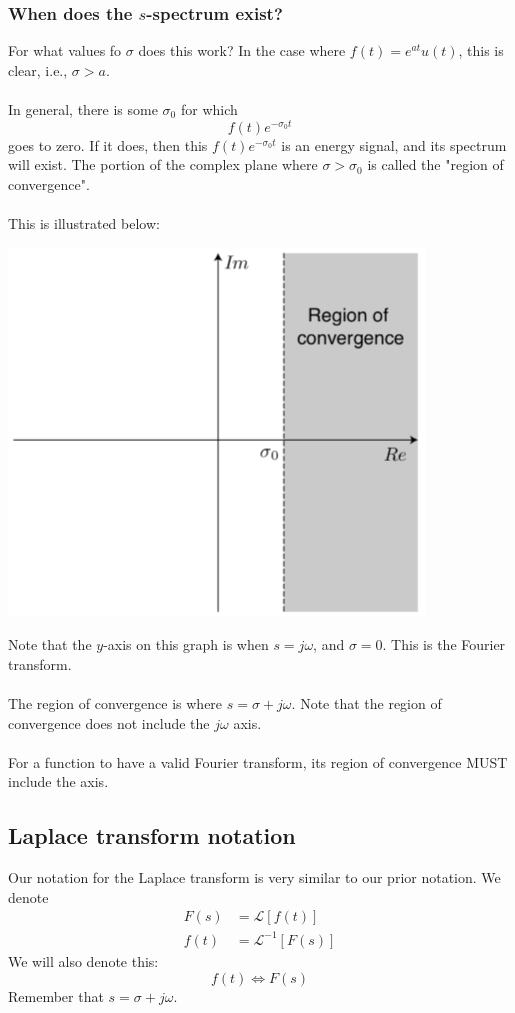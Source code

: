 \documentclass[10pt]{article}
\newcommand{\llra}{\Longleftrightarrow}
\begin{document}
\subsubsection*{When does the $s$-spectrum exist?}
For what values fo $\sigma$ does this work?  In the case where $f(t) = e^{at} u(t)$, this is clear, i.e., $\sigma > a$.\\\\
In general, there is some $\sigma_0$ for which
\[f(t) e^{-\sigma_0 t}\]
goes to zero.  If it does, then this $f(t) e^{-\sigma_0 t}$ is an energy signal, and its spectrum will exist.  The portion of the complex plane where $\sigma > \sigma_0$ is called the "region of convergence".\\\\
This is illustrated below:
\begin{center}
    \includegraphics*[scale=0.8]{W8_21.png}
\end{center}
Note that the $y$-axis on this graph is when $s = j\omega$, and $\sigma = 0$.  This is the Fourier transform.\\\\
The region of convergence is where $s = \sigma + j\omega$.  Note that the region of convergence does not include the $j\omega$ axis.\\\\
For a function to have a valid Fourier transform, its region of convergence MUST include the axis.

\subsection*{Laplace transform notation}
Our notation for the Laplace transform is very similar to our prior notation.  We denote
\begin{align*}
    F(s) &= \mathcal{L}[f(t)]\\
    f(t) &= \mathcal{L}^{-1}[F(s)]
\end{align*}
We will also denote this:
\[f(t) \llra F(s)\]
Remember that $s = \sigma + j\omega$.
\end{document}
